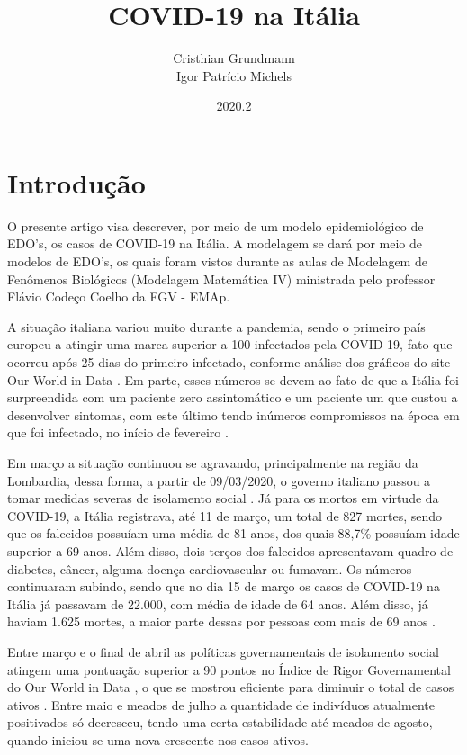 \documentclass{article}
\title{COVID-19 na Itália}
\author{Cristhian Grundmann \\
Igor Patrício Michels}
\date{2020.2}
\begin{document}
\maketitle

\section{Introdução}

O presente artigo visa descrever, por meio de um modelo epidemiológico de EDO's, os casos de COVID-19 na Itália. A modelagem se dará por meio de modelos de EDO's, os quais foram vistos durante as aulas de Modelagem de Fenômenos Biológicos (Modelagem Matemática IV) ministrada pelo professor Flávio Codeço Coelho da FGV - EMAp.

A situação italiana variou muito durante a pandemia, sendo o primeiro país europeu a atingir uma marca superior a 100 infectados pela COVID-19, fato que ocorreu após 25 dias do primeiro infectado, conforme análise dos gráficos do site Our World in Data \cite{owid}. Em parte, esses números se devem ao fato de que a Itália foi surpreendida com um paciente zero assintomático e um paciente um que custou a desenvolver sintomas, com este último tendo inúmeros compromissos na época em que foi infectado, no início de fevereiro \cite{dn}\cite{cm}.

Em março a situação continuou se agravando, principalmente na região da Lombardia, dessa forma, a partir de 09/03/2020, o governo italiano passou a tomar medidas severas de isolamento social \cite{piccolomini}. Já para os mortos em virtude da COVID-19, a Itália registrava, até 11 de março, um total de 827 mortes, sendo que os falecidos possuíam uma média de 81 anos, dos quais 88,7\% possuíam idade superior a 69 anos. Além disso, dois terços dos falecidos apresentavam quadro de diabetes, câncer, alguma doença cardiovascular ou fumavam. Os números continuaram subindo, sendo que no dia 15 de março os casos de COVID-19 na Itália já passavam de 22.000, com média de idade de 64 anos. Além disso, já haviam 1.625 mortes, a maior parte dessas por pessoas com mais de 69 anos \cite{REMUZZI20201225}\cite{10.1001/jama.2020.4344}.

Entre março e o final de abril as políticas governamentais de isolamento social atingem uma pontuação superior a 90 pontos no Índice de Rigor Governamental do Our World in Data \cite{owid}, o que se mostrou eficiente para diminuir o total de casos ativos \cite{italia}. Entre maio e meados de julho a quantidade de indivíduos atualmente positivados só decresceu, tendo uma certa estabilidade até meados de agosto, quando iniciou-se uma nova crescente nos casos ativos.
\end{document}
